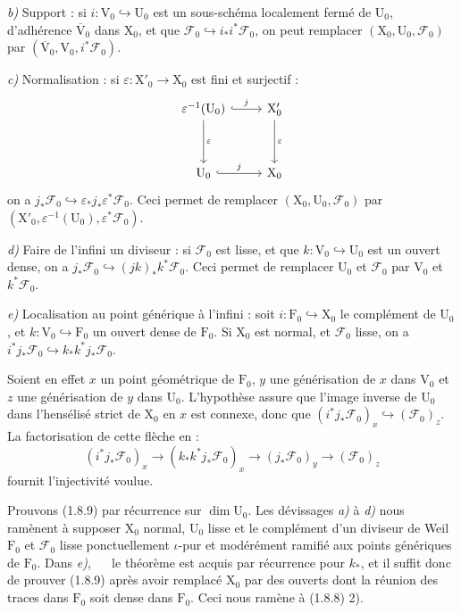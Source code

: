 \documentclass[11pt,leqno]{article}
\newcommand{\Page}[1]{\ifvmode\noindent\else\unskip\ \fi{\footnotesize\textcolor{gray}{[p.\,#1]}}\ \ignorespaces}
\begin{document}
\textit{b)} Support : si \(i:\mathrm{V}_0\hookrightarrow\mathrm{U}_0\) est un sous-schéma localement fermé de \(\mathrm{U}_0\), d’adhérence \(\overline{\mathrm{V}}_0\) dans \(\mathrm{X}_0\), et que \(\mathscr{F}_0\hookrightarrow i_*i^*\mathscr{F}_0\), on peut remplacer \((\mathrm{X}_0,\mathrm{U}_0,\mathscr{F}_0)\) par \((\overline{\mathrm{V}}_0,\mathrm{V}_0,i^*\mathscr{F}_0)\).

\textit{c)} Normalisation : si \(\varepsilon:\mathrm{X}'_0\to\mathrm{X}_0\) est fini et surjectif :
\[
\begin{tikzcd}[column sep=2.5em,row sep=3.5em]
\varepsilon^{-1}(\mathrm{U}_0)
  \arrow[r,hook,"j"] \arrow[d,"\varepsilon"]
  & \mathrm{X}'_0 \arrow[d,"\varepsilon"] \\
\mathrm{U}_0 \arrow[r,hook,"j"]
  & \mathrm{X}_0
\end{tikzcd}
\]
on a \(j_*\mathscr{F}_0\hookrightarrow\varepsilon_*j_*\varepsilon^*\mathscr{F}_0\). Ceci permet de remplacer \((\mathrm{X}_0,\mathrm{U}_0,\mathscr{F}_0)\) par \((\mathrm{X}'_0,\varepsilon^{-1}(\mathrm{U}_0),\varepsilon^*\mathscr{F}_0)\).

\textit{d)} Faire de l’infini un diviseur : si \(\mathscr{F}_0\) est lisse, et que \(k:\mathrm{V}_0\hookrightarrow\mathrm{U}_0\) est un ouvert dense, on a \(j_*\mathscr{F}_0\hookrightarrow(jk)_*k^*\mathscr{F}_0\). Ceci permet de remplacer \(\mathrm{U}_0\) et \(\mathscr{F}_0\) par \(\mathrm{V}_0\) et \(k^*\mathscr{F}_0\).

\textit{e)} Localisation au point générique à l’infini : soit \(i:\mathrm{F}_0\hookrightarrow\mathrm{X}_0\) le complément de \(\mathrm{U}_0\), et \(k:\mathrm{V}_0\hookrightarrow\mathrm{F}_0\) un ouvert dense de \(\mathrm{F}_0\). Si \(\mathrm{X}_0\) est normal, et \(\mathscr{F}_0\) lisse, on a \(i^*j_*\mathscr{F}_0\hookrightarrow k_*k^*j_*\mathscr{F}_0\).

Soient en effet \(x\) un point géométrique de \(\mathrm{F}_0\), \(y\) une générisation de \(x\) dans \(\mathrm{V}_0\) et \(z\) une générisation de \(y\) dans \(\mathrm{U}_0\). L’hypothèse assure que l’image inverse de \(\mathrm{U}_0\) dans l’hensélisé strict de \(\mathrm{X}_0\) en \(x\) est connexe, donc que \((i^*j_*\mathscr{F}_0)_x\hookrightarrow(\mathscr{F}_0)_z\). La factorisation de cette flèche en :
\[
(i^*j_*\mathscr{F}_0)_x
\to(k_*k^*j_*\mathscr{F}_0)_x
\to(j_*\mathscr{F}_0)_y
\to(\mathscr{F}_0)_z
\]
fournit l’injectivité voulue.

Prouvons (1.8.9) par récurrence sur \(\dim\mathrm{U}_0\). Les dévissages \textit{a)} à \textit{d)} nous ramènent à supposer \(\mathrm{X}_0\) normal, \(\mathrm{U}_0\) lisse et le complément d’un diviseur de Weil \(\mathrm{F}_0\) et \(\mathscr{F}_0\) lisse ponctuellement \(\iota\)-pur et modérément ramifié aux points génériques de \(\mathrm{F}_0\). Dans \textit{e)},
\Page{178}
le théorème est acquis par récurrence pour \(k_*\), et il suffit donc de prouver (1.8.9) après avoir remplacé \(\mathrm{X}_0\) par des ouverts dont la réunion des traces dans \(\mathrm{F}_0\) soit dense dans \(\mathrm{F}_0\). Ceci nous ramène à (1.8.8) 2).
\end{document}
